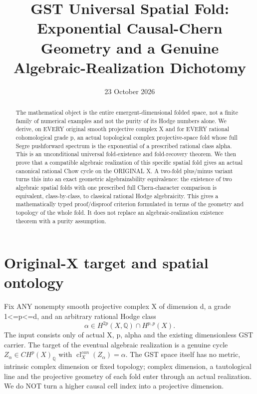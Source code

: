 \documentclass[11pt]{article}
\title{GST Universal Spatial Fold: Exponential Causal-Chern Geometry and a Genuine Algebraic-Realization Dichotomy}
\date{23 October 2026}
\begin{document}
\maketitle
\begin{abstract}
The mathematical object is the entire emergent-dimensional folded space,
not a finite family of numerical examples and not the purity of its
Hodge numbers alone. We derive, on EVERY original smooth projective
complex X and for EVERY rational cohomological grade p, an actual
topological complex projective-space fold whose full Segre pushforward
spectrum is the exponential of a prescribed rational class alpha.
This is an unconditional universal fold-existence and fold-recovery theorem.
We then prove that a compatible algebraic realization of this
specific spatial fold gives an actual canonical rational Chow cycle
on the ORIGINAL X. A two-fold plus/minus variant turns this into
an exact geometric algebraizability equivalence: the existence of
two algebraic spatial folds with one prescribed full Chern-character
comparison is equivalent, class-by-class, to classical rational
Hodge algebraicity. This gives a mathematically typed proof/disproof
criterion formulated in terms of the geometry and topology of the
whole fold. It does not replace an algebraic-realization existence
theorem with a purity assumption.
\end{abstract}

\section{Original-X target and spatial ontology}
Fix ANY nonempty smooth projective complex X of dimension d,
a grade 1<=p<=d, and an arbitrary rational Hodge class
\[
 \alpha\in H^{2p}(X,\mathbb Q)\cap H^{p,p}(X).
\]
The input consists only of actual X, p, alpha and the existing
dimensionless GST carrier. The target of the eventual
algebraic realization is a genuine cycle
$Z_\alpha\in CH^p(X)_{\mathbb Q}$ with
$\operatorname{cl}_X^{can}(Z_\alpha)=\alpha$.
The GST space itself has no metric, intrinsic complex dimension
or fixed topology; complex dimension, a tautological line
and the projective geometry of each fold enter through
an actual realization. We do NOT turn a higher causal cell
index into a projective dimension.
\end{document}
